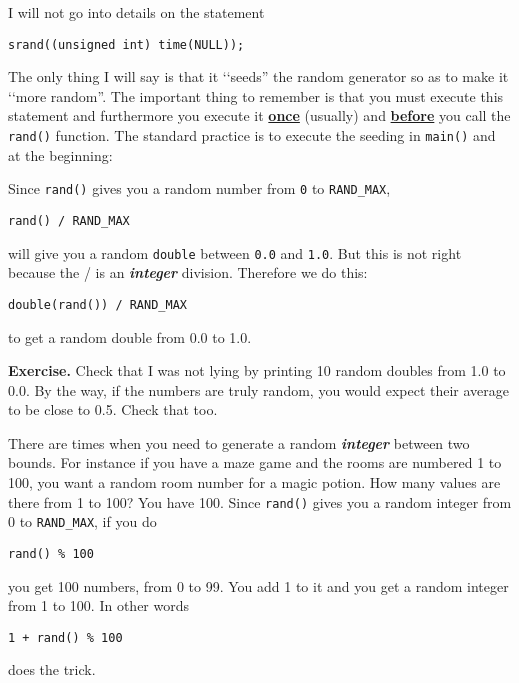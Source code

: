 I will not go into details on the statement
\begin{center}
\texttt{srand((unsigned int) time(NULL));}
\end{center}
The only thing I will say is that it \lq\lq seeds'' the random generator so
as to make it \lq\lq more random''. The important thing to remember is that
you must execute this statement and furthermore you execute it
\textbf{\underline{once}} (usually) and \textbf{\underline{before}} you call the \texttt{rand()} function. The standard practice is to execute the seeding
in \texttt{main()} and at the beginning:
Since \verb!rand()! gives you a random number from \verb!0! to \verb!RAND_MAX!,
\begin{center}
\texttt{rand() / RAND\_MAX}
\end{center}
will give you a random \verb!double! between \verb!0.0! and \verb!1.0!.
But this is not right because the / is an \textit{\textbf{integer}}
division. Therefore we do this:
\begin{center}
\texttt{double(rand()) / RAND\_MAX}
\end{center}
to get a random double from 0.0 to 1.0.

\textbf{Exercise.} Check that I was not lying by printing 10 random
doubles from 1.0 to 0.0. By the way, if the numbers are truly random,
you would expect their average to be close to 0.5. Check that too.

There are times when you need to generate a random
\textit{\textbf{integer}} between two bounds. For instance if you have a
maze game and the rooms are numbered 1 to 100, you want a random room
number for a magic potion. How many values are there from 1 to 100? You
have 100. Since \texttt{rand()} gives you a random integer from 0 to
\texttt{RAND\_MAX}, if you do

\begin{center}
        \texttt{rand() \% 100}
\end{center}
you get 100 numbers, from 0 to 99. You add 1 to it and you get a random
integer from 1 to 100. In other words
\begin{center}
        \texttt{1 + rand() \% 100}
\end{center}

does the trick.

